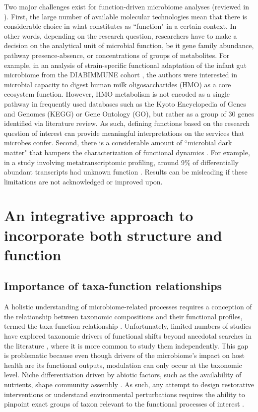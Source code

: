 Two major challenges exist for function-driven microbiome analyses (reviewed in \cite{heintz-buschart2018human}). First, the large number of available molecular technologies mean that there is considerable choice in what constitutes as ``function" in a certain context. In other words, depending on the research question, researchers have to make a decision on the analytical unit of microbial function, be it gene family abundance, pathway presence-absence, or concentrations of groups of metabolites. For example, in an analysis of strain-specific functional adaptation of the infant gut microbiome from the DIABIMMUNE cohort \cite{vatanen2018human}, the authors were interested in microbial capacity to digest human milk oligosaccharides (HMO) as a core ecosystem function. However, HMO metabolism is not encoded as a single pathway in frequently used databases such as the Kyoto Encyclopedia of Genes and Genomes (KEGG) or Gene Ontology (GO), but rather as a group of 30 genes identified via literature review. As such, defining functions based on the research question of interest can provide meaningful interpretations on the services that microbes confer. Second, there is a considerable amount of ``microbial dark matter" that hampers the characterization of functional dynamics \cite{jiao2021microbial}. For example, in a study involving metatranscriptomic profiling, around 9\% of differentially abundant transcripts had unknown function \cite{heintz-buschart2017integrated}. Results can be misleading if these limitations are not acknowledged or improved upon. 

\section{An integrative approach to incorporate both structure and function}

\subsection{Importance of taxa-function relationships}

A holistic understanding of microbiome-related processes requires a conception of the relationship between taxonomic compositions and their functional profiles, termed the taxa-function relationship \cite{langille2018exploring, heintz-buschart2018human}. Unfortunately, limited numbers of studies have explored taxonomic drivers of functional shifts beyond anecdotal searches in the literature \cite{manor2017systematic}, where it is more common to study them independently. This gap is problematic because even though drivers of the microbiome's impact on host health are its functional outputs, modulation can only occur at the taxonomic level. Niche differentiation driven by abiotic factors, such as the availability of nutrients, shape community assembly \cite{pereira2017microbial}. As such, any attempt to design restorative interventions or understand environmental perturbations requires the ability to pinpoint exact groups of taxon relevant to the functional processes of interest \cite{wong2019new}.   

